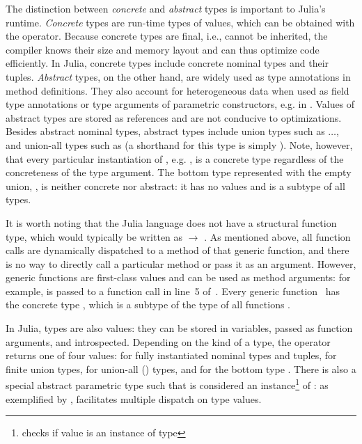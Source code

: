 The distinction between \emph{concrete} and \emph{abstract} types
is important to Julia's runtime.
\emph{Concrete} types are run-time types of values, which can be
obtained with the  operator. Because concrete types are final, 
i.e., cannot be inherited, the compiler knows their size and memory layout
and can thus optimize code efficiently.
In Julia, concrete types include concrete nominal types and their tuples.
\emph{Abstract} types, on the other hand,
are widely used as type annotations in method definitions.
They also account for heterogeneous data when used as field type annotations
or type arguments of parametric constructors, e.g. in .
Values of abstract types are stored as references and are not conducive
to optimizations.
Besides abstract nominal types, abstract types include union types
such as $\ldots$, and union-all types
such as  (a shorthand for this type 
is simply ). Note, however, that every particular instantiation of
, e.g. , is a concrete type
regardless of the concreteness of the type argument.
The bottom type represented with the empty union, , is neither
concrete nor abstract: it has no values and is a subtype of all types.

It is worth noting that the Julia language does not have a structural function type,
which would typically be written as  $\rightarrow$ . As mentioned above,
all function calls are dynamically dispatched to a method of that generic
function, and there is no way to directly call a particular method or
pass it as an argument.
However, generic functions are first-class values and can be used as
method arguments: for example, \cjl{(-)} is passed to a function call in line~5
of~.
Every generic function~ has the concrete type ,
which is a subtype of the type of all functions .

In Julia, types are also values: they can be stored in variables, 
passed as function arguments, and introspected.
Depending on the kind of a type, the  operator returns
one of four values:
 for fully instantiated nominal types and tuples,
 for finite union types,
 for union-all () types,
and  for the bottom type .
There is also a special abstract parametric type 
such that  is considered an instance\footnote{
checks if value  is an instance of type } of :
as exemplified by ,
 facilitates multiple dispatch on type values.

